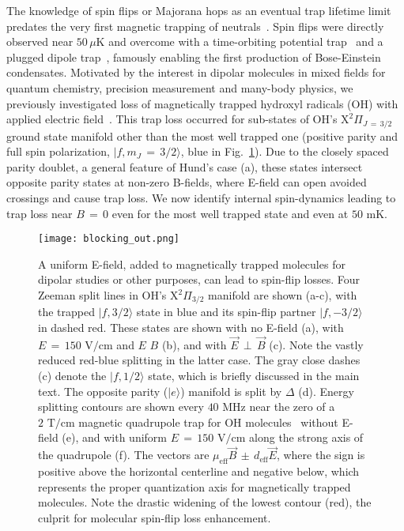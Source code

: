 \documentclass[%
 reprint,
 amsmath,amssymb,
 aps,
prl,
]{revtex4-1}
\newcommand{\epb}{{$\vec{E}\,{\perp}\,\vec{B}$}}
\begin{document}
The knowledge of spin flips or Majorana hops as an eventual trap lifetime limit predates the very first magnetic trapping of neutrals~\cite{Migdall1985}. 
Spin flips were directly observed near $50\,\mu\text{K}$ and overcome with a time-orbiting potential trap~\cite{Petrich1995} and a plugged dipole trap~\cite{Davis1995}, famously enabling the first production of Bose-Einstein condensates.
Motivated by the interest in dipolar molecules in mixed fields for quantum chemistry, precision measurement and many-body physics, we previously investigated loss of magnetically trapped hydroxyl radicals (OH) with applied electric field~\cite{Stuhl2012uwave}. 
This trap loss occurred for sub-states of OH's $\mathrm{X}^2\Pi_{J\,{=}\,3/2}$ ground state manifold other than the most well trapped one (positive parity and full spin polarization, $|f,m_J\,{=}\,3/2\rangle$, blue in Fig.~\ref{fig:blocking}). 
Due to the closely spaced parity doublet, a general feature of Hund's case (a), these states intersect opposite parity states at non-zero B-fields, where E-field can open avoided crossings and cause trap loss.
We now identify internal spin-dynamics leading to trap loss near $B\,{=}\,0$ even for the most well trapped state and even at $50\text{ mK}$.

\begin{figure}[tb]
\texttt{[image: blocking\_out.png]}%
\caption{
A uniform E-field, added to magnetically trapped molecules for dipolar studies or other purposes, can lead to spin-flip losses. 
Four Zeeman split lines in OH's $\mathrm{X}^2\Pi_{3/2}$ manifold are shown (a-c), with the trapped $|f,3/2\rangle$ state in blue and its spin-flip partner $|f,-3/2\rangle$ in dashed red. 
These states are shown with no E-field (a), with $E\,{=}\,150\text{ V/cm}$ and $E\,$\raisebox{1px}{${\parallel}$}$\,B$ (b), and with \epb{} (c). 
Note the vastly reduced red-blue splitting in the latter case. 
The gray close dashes (c) denote the $|f,1/2\rangle$ state, which is briefly discussed in the main text.
The opposite parity ($|e\rangle$) manifold is split by $\Delta$ (d). 
Energy splitting contours are shown every $40\text{ MHz}$ near the zero of a $2\text{ T/cm}$ magnetic quadrupole trap for OH molecules~\cite{Stuhl2012uwave} without E-field (e), and with uniform $E\,{=}\,150\text{ V/cm}$ along the strong axis of the quadrupole (f). 
The vectors are $\mu_\text{eff}\vec{B}\,{\pm}\, d_\text{eff}\vec{E}$, where the sign is positive above the horizontal centerline and negative below, which  represents the proper quantization axis for magnetically trapped molecules. 
Note the drastic widening of the lowest contour (red), the culprit for molecular spin-flip loss enhancement.
}
\label{fig:blocking}
\end{figure}
\end{document}
